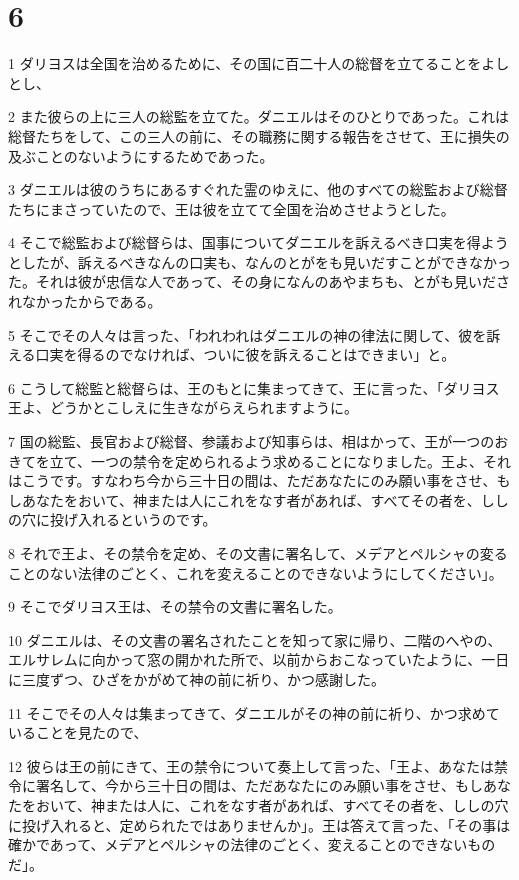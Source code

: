 \chapter{6}

\par 1 ダリヨスは全国を治めるために、その国に百二十人の総督を立てることをよしとし、
\par 2 また彼らの上に三人の総監を立てた。ダニエルはそのひとりであった。これは総督たちをして、この三人の前に、その職務に関する報告をさせて、王に損失の及ぶことのないようにするためであった。
\par 3 ダニエルは彼のうちにあるすぐれた霊のゆえに、他のすべての総監および総督たちにまさっていたので、王は彼を立てて全国を治めさせようとした。
\par 4 そこで総監および総督らは、国事についてダニエルを訴えるべき口実を得ようとしたが、訴えるべきなんの口実も、なんのとがをも見いだすことができなかった。それは彼が忠信な人であって、その身になんのあやまちも、とがも見いだされなかったからである。
\par 5 そこでその人々は言った、「われわれはダニエルの神の律法に関して、彼を訴える口実を得るのでなければ、ついに彼を訴えることはできまい」と。
\par 6 こうして総監と総督らは、王のもとに集まってきて、王に言った、「ダリヨス王よ、どうかとこしえに生きながらえられますように。
\par 7 国の総監、長官および総督、参議および知事らは、相はかって、王が一つのおきてを立て、一つの禁令を定められるよう求めることになりました。王よ、それはこうです。すなわち今から三十日の間は、ただあなたにのみ願い事をさせ、もしあなたをおいて、神または人にこれをなす者があれば、すべてその者を、ししの穴に投げ入れるというのです。
\par 8 それで王よ、その禁令を定め、その文書に署名して、メデアとペルシャの変ることのない法律のごとく、これを変えることのできないようにしてください」。
\par 9 そこでダリヨス王は、その禁令の文書に署名した。
\par 10 ダニエルは、その文書の署名されたことを知って家に帰り、二階のへやの、エルサレムに向かって窓の開かれた所で、以前からおこなっていたように、一日に三度ずつ、ひざをかがめて神の前に祈り、かつ感謝した。
\par 11 そこでその人々は集まってきて、ダニエルがその神の前に祈り、かつ求めていることを見たので、
\par 12 彼らは王の前にきて、王の禁令について奏上して言った、「王よ、あなたは禁令に署名して、今から三十日の間は、ただあなたにのみ願い事をさせ、もしあなたをおいて、神または人に、これをなす者があれば、すべてその者を、ししの穴に投げ入れると、定められたではありませんか」。王は答えて言った、「その事は確かであって、メデアとペルシャの法律のごとく、変えることのできないものだ」。

